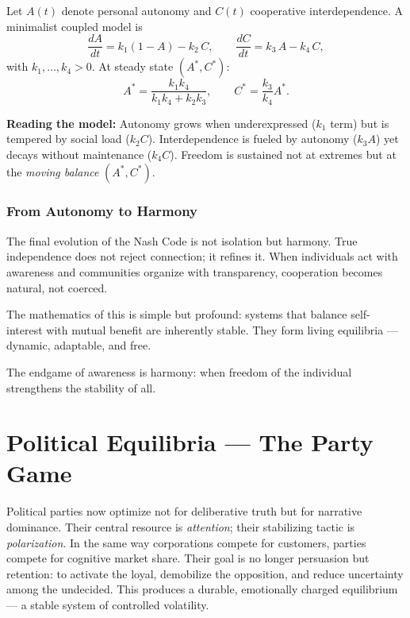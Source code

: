 \documentclass[12pt,twoside]{book}
\begin{document}
\begin{tcolorbox}[colback=gray!5,colframe=gray!60,boxrule=0.4pt,arc=1mm,
title=Mathematical Interlude: A Dynamic Equilibrium of Freedom]

Let $A(t)$ denote personal autonomy and $C(t)$ cooperative interdependence.  
A minimalist coupled model is
\[
\frac{dA}{dt}=k_1(1-A)-k_2\,C,
\qquad
\frac{dC}{dt}=k_3\,A-k_4\,C,
\]
with $k_1,\dots,k_4>0$.  
At steady state $(A^*,C^*)$:
\[
A^*=\frac{k_1k_4}{k_1k_4+k_2k_3},
\qquad
C^*=\frac{k_3}{k_4}A^*.
\]

\textbf{Reading the model:} Autonomy grows when underexpressed ($k_1$ term) but is tempered by social load ($k_2C$).  
Interdependence is fueled by autonomy ($k_3A$) yet decays without maintenance ($k_4C$).  
Freedom is sustained not at extremes but at the \emph{moving balance} $(A^*,C^*)$.
\end{tcolorbox}

\subsection*{From Autonomy to Harmony}

The final evolution of the Nash Code is not isolation but harmony.  
True independence does not reject connection; it refines it.  
When individuals act with awareness and communities organize with transparency, cooperation becomes natural, not coerced.  

The mathematics of this is simple but profound:  
systems that balance self-interest with mutual benefit are inherently stable.  
They form living equilibria --- dynamic, adaptable, and free.\\

\begin{keyidea}
The endgame of awareness is harmony: when freedom of the individual strengthens the stability of all.
\end{keyidea}

\chapter{Political Equilibria — The Party Game}

Political parties now optimize not for deliberative truth but for narrative dominance.  
Their central resource is \emph{attention}; their stabilizing tactic is \emph{polarization}.  
In the same way corporations compete for customers, parties compete for cognitive market share.  
Their goal is no longer persuasion but retention: to activate the loyal, demobilize the opposition, and reduce uncertainty among the undecided.  
This produces a durable, emotionally charged equilibrium --- a stable system of controlled volatility.
\end{document}
